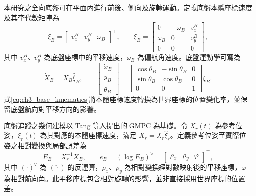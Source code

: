 本研究之全向底盤可在平面內進行前後、側向及旋轉運動。定義底盤本體座標速度及其李代數矩陣為
\begin{equation}
    \xi_B =
    \begin{bmatrix}
        v_x^B & v_y^B & \omega_B
    \end{bmatrix}^{\top},
    \qquad
    \widehat{\xi}_B =
    \begin{bmatrix}
        0 & -\omega_B & v_x^B \\
        \omega_B & 0 & v_y^B \\
        0 & 0 & 0
    \end{bmatrix},
    \label{eq:ch3_body_velocity_hat}
\end{equation}
其中 $v_x^B$、$v_y^B$ 為底盤座標中的平移速度，$\omega_B$ 為偏航角速度。底盤運動學可寫為
\begin{equation}
    \dot{X}_B = X_B\widehat{\xi}_B,
    \qquad
    \begin{bmatrix}
        \dot{x}_B \\
        \dot{y}_B \\
        \dot{\theta}_B
    \end{bmatrix}
    =
    \begin{bmatrix}
        \cos\theta_B & -\sin\theta_B & 0 \\
        \sin\theta_B & \cos\theta_B & 0 \\
        0 & 0 & 1
    \end{bmatrix}
    \xi_B.
    \label{eq:ch3_base_kinematics}
\end{equation}
式\eqref{eq:ch3_base_kinematics}將本體座標速度轉換為世界座標的位置變化率，並保留底盤航向對平移方向的影響。

底盤追蹤之幾何建模以 Tang 等人\cite{tang2024gmpc}提出的 GMPC 為基礎。令 $X_r(t)$ 為參考位姿，$\xi_r(t)$ 為其對應的本體座標速度，滿足 $\dot{X}_r=X_r\widehat{\xi}_r$。定義參考位姿至實際位姿之相對變換與局部誤差為
\begin{equation}
    E_B = X_r^{-1}X_B,
    \qquad
    e_B = \left(\log E_B\right)^{\vee}
    =
    \begin{bmatrix}
        \rho_x & \rho_y & \varphi
    \end{bmatrix}^{\top},
    \label{eq:ch3_geometric_tracking_error}
\end{equation}
其中 $(\cdot)^{\vee}$ 為 $(\widehat{\cdot})$ 的反運算，$\rho_x$、$\rho_y$ 為相對變換經對數映射後的平移座標，$\varphi$ 為相對航向角。此平移座標包含相對旋轉的影響，並非直接採用世界座標的位置差。

